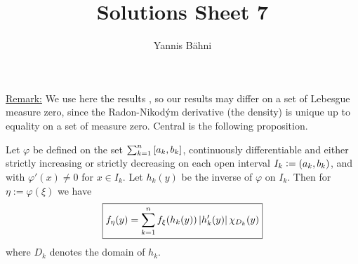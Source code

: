 
\DeclareMathOperator{\Poi}{Poi}
\DeclareMathOperator{\Bin}{Bin}
\DeclareMathOperator{\Var}{Var}
\newcommand\Psf{\mathsf{P}}
\newcommand\Esf{\mathsf{E}}


\title{Solutions Sheet 7}
\author{Yannis B\"{a}hni}
\address[Yannis B\"{a}hni]{University of Zurich, R\"{a}mistrasse 71, 8006 Zurich}


\maketitle
\thispagestyle{fancy}
\underline{Remark:} We use here the results \cite[289--290]{shiryaev2016probability}, so our results may differ on a set of Lebesgue measure zero, since the Radon-Nikod\'ym derivative (the density) is unique up to equality on a set of measure zero. Central is the following proposition.
\begin{proposition}
	Let $\varphi$ be defined on the set $\sum_{k = 1}^n\intcc{a_k,b_k}$, continuously differentiable and either strictly increasing or strictly decreasing on each open interval $I_k := \intoo{a_k,b_k}$, and with $\varphi'(x) \neq 0$ for $x \in I_k$. Let $h_k(y)$ be the inverse of $\varphi$ on $I_k$. Then for $\eta := \varphi(\xi)$ we have
	\begin{equation}
		\boxed{f_\eta(y) = \sum_{k = 1}^n f_\xi(h_k(y))\abs[0]{h'_k(y)}\chi_{D_k}(y)}
	\end{equation}
	\noindent where $D_k$ denotes the domain of $h_k$.
\end{proposition}
